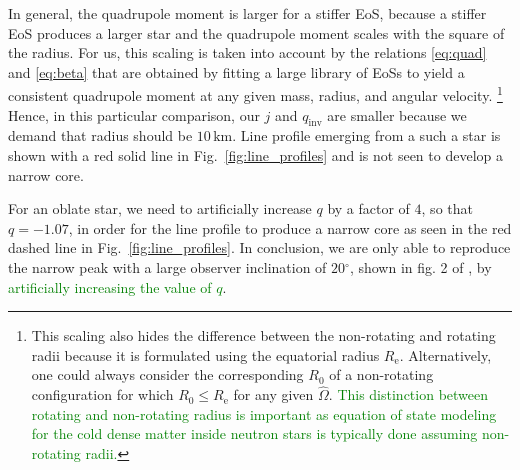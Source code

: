\documentclass{aa}
\newcommand{\refe}[1]{\textcolor{green}{{#1}}}
\newcommand{\refedel}[1]{}
\newcommand{\Ob}{\ensuremath{\hat{\Omega}}}
\newcommand{\Msun}{\ensuremath{M_{\odot}}}
\newcommand{\qinv}{\ensuremath{q_{\mathrm{inv}}}}
\renewcommand{\deg}{\ensuremath{^{\circ}}}
\begin{document}
In general, the quadrupole moment is larger for a stiffer EoS, because a stiffer EoS produces a larger star and the quadrupole moment scales with the square of the radius.
For us, this scaling is taken into account by the relations \eqref{eq:quad} and \eqref{eq:beta} that are obtained by fitting a large library of EoSs \citep[see][]{BBP13, aGM14} to yield a consistent quadrupole moment at any given mass, radius,\refedel{ (i.e., stiffness)} and angular velocity.%
\footnote{This scaling also hides the difference between the non-rotating and rotating radii because it is formulated using the equatorial radius $R_{\mathrm{e}}$.
Alternatively, one could always consider the corresponding $R_0$ of a non-rotating configuration for which $R_0 \le R_{\mathrm{e}}$ for any given $\Ob$.
\refe{This distinction between rotating and non-rotating radius is important as equation of state modeling for the cold dense matter inside neutron stars is typically done assuming non-rotating radii.}
}
Hence, in this particular comparison, our $j$ and $\qinv$ are smaller because we demand that radius should be $10\,\mathrm{km}$.
Line profile emerging from a such a star is shown with a red solid line in Fig.~\ref{fig:line_profiles} and is not seen to develop a narrow core. 
\refedel{This is because the quadrupole moment is not strong enough to dominate the countering effect of the region of increased redshift around the pole.}
For an oblate star, we need to artificially increase $q$ by a factor of $4$, so that $q = -1.07$, in order for the line profile to produce a narrow core as seen in the red dashed line in Fig.~\ref{fig:line_profiles}.
In conclusion, we are only able to reproduce the narrow peak with a large observer inclination of $20\deg$, shown in fig. 2 of \citet{BPO13}, by \refe{artificially increasing the value of $q$}. 
\end{document}
